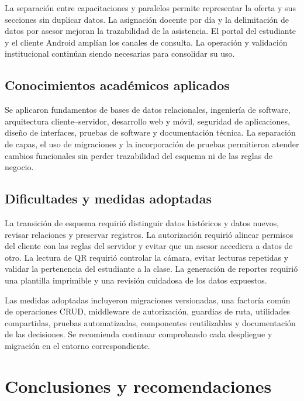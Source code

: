 \documentclass[12pt,a4paper,oneside]{report}
\begin{document}
La separación entre capacitaciones y paralelos permite representar la oferta y sus secciones sin duplicar datos. La asignación docente por día y la delimitación de datos por asesor mejoran la trazabilidad de la asistencia. El portal del estudiante y el cliente Android amplían los canales de consulta. La operación y validación institucional continúan siendo necesarias para consolidar su uso.

\section{Conocimientos académicos aplicados}

Se aplicaron fundamentos de bases de datos relacionales, ingeniería de software, arquitectura cliente--servidor, desarrollo web y móvil, seguridad de aplicaciones, diseño de interfaces, pruebas de software y documentación técnica. La separación de capas, el uso de migraciones y la incorporación de pruebas permitieron atender cambios funcionales sin perder trazabilidad del esquema ni de las reglas de negocio.

\section{Dificultades y medidas adoptadas}

La transición de esquema requirió distinguir datos históricos y datos nuevos, revisar relaciones y preservar registros. La autorización requirió alinear permisos del cliente con las reglas del servidor y evitar que un asesor accediera a datos de otro. La lectura de QR requirió controlar la cámara, evitar lecturas repetidas y validar la pertenencia del estudiante a la clase. La generación de reportes requirió una plantilla imprimible y una revisión cuidadosa de los datos expuestos.

Las medidas adoptadas incluyeron migraciones versionadas, una factoría común de operaciones CRUD, middleware de autorización, guardias de ruta, utilidades compartidas, pruebas automatizadas, componentes reutilizables y documentación de las decisiones. Se recomienda continuar comprobando cada despliegue y migración en el entorno correspondiente.

\chapter{Conclusiones y recomendaciones}
\end{document}
